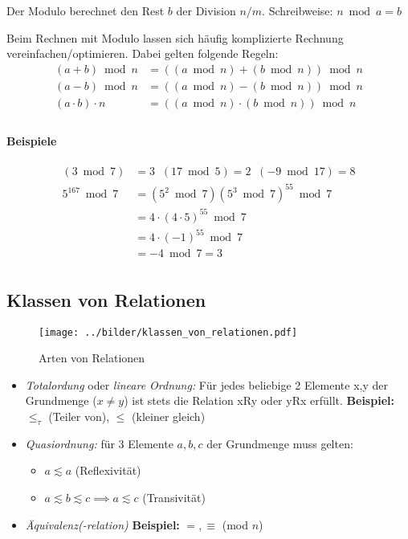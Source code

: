 Der Modulo berechnet den Rest $b$ der Division $n/m$. Schreibweise: $n \bmod a = b$

Beim Rechnen mit Modulo lassen sich häufig komplizierte Rechnung
vereinfachen/optimieren. Dabei gelten folgende Regeln:
\begin{align*}
  (a+b) \bmod n       &= ((a \bmod n) + (b \bmod n)) \bmod n \\
  (a-b) \bmod n       &= ((a \bmod n) - (b \bmod n)) \bmod n \\
  (a \cdot b) \cdot n &= ((a \bmod n) \cdot (b \bmod n)) \bmod n \\
\end{align*}

\paragraph{Beispiele}
\begin{align*}
  (3 \bmod 7)&= 3   \;\;   (17 \bmod 5)= 2   \;\;    (-9 \bmod 17)= 8 \\
  5^{167} \bmod 7 &= (5^2 \bmod 7) (5^3 \bmod 7)^{55} \bmod 7 \\
                 &= 4 \cdot (4 \cdot 5)^{55} \bmod 7 \\
                 &= 4 \cdot (-1)^{55} \bmod 7\\
                 &= -4 \bmod 7 = 3\\
\end{align*}

\subsection{Klassen von Relationen}

\begin{figure}[h]
  \texttt{[image: ../bilder/klassen\_von\_relationen.pdf]}
  \caption{Arten von Relationen}
\end{figure}

\begin{itemize}
\item \emph{Totalordung} oder \emph{lineare Ordnung:} Für jedes
  beliebige 2 Elemente x,y der Grundmenge ($x \ne y$) ist stets die
  Relation xRy oder yRx erfüllt. \textbf{Beispiel:} $\le_\tau$ (Teiler
  von), $\le$ (kleiner gleich)
\item \emph{Quasiordnung:} für 3 Elemente $a,b,c$ der Grundmenge muss gelten:
  \begin{itemize}
  \item $a\lesssim a$ (Reflexivität)
  \item $a\lesssim b\lesssim c \implies a \lesssim c$ (Transivität)
  \end{itemize}
\item \emph{Äquivalenz(-relation)}  \textbf{Beispiel:} $=, \equiv$ (mod $n$)
\end{itemize}


